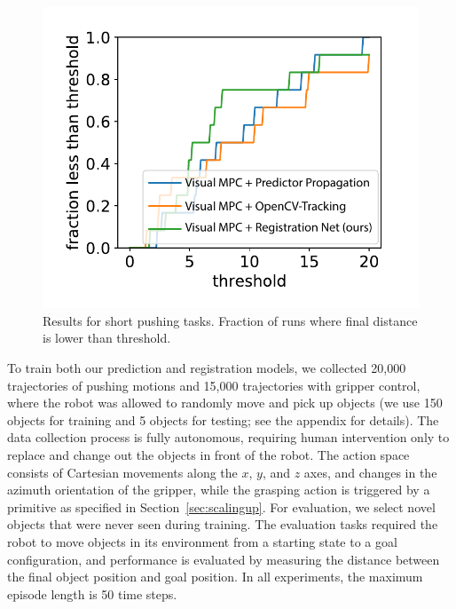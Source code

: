\begin{figure}
	\vspace{-0.2in}
	\centering
	\includegraphics[width=0.35\columnwidth]{images/pushshort_bench_plots.pdf}
	\vspace{-0.8cm}
	\caption{\small{Results for short pushing tasks.  Fraction of runs where final distance is lower than threshold.}}
	\label{fig:push_bench_short}
	\vspace{-0.2in}
\end{figure}


To train both our prediction and registration models, we collected 20,000 trajectories of pushing motions and 15,000 trajectories with gripper control, where the robot was allowed to randomly move and pick up objects (we use 150 objects for training and 5 objects for testing; see the appendix for details). The data collection process is fully autonomous, requiring human intervention only to replace and change out the objects in front of the robot.
The action space consists of Cartesian movements along the $x$, $y$, and $z$ axes, and changes in the azimuth orientation of the gripper, while the grasping action is triggered by a primitive as specified in Section~\ref{sec:scalingup}. For evaluation, we select novel objects that were never seen during training. The evaluation tasks required the robot to move objects in its environment from a starting state to a goal configuration, and performance is evaluated by measuring the distance between the final object position and goal position. In all experiments, the maximum episode length is 50 time steps.

\vspace{-0.1in}
